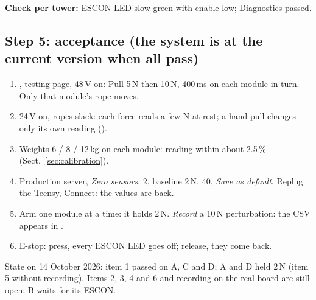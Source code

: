 \textbf{Check per tower:} ESCON LED slow green with enable low; Diagnostics passed.

\subsection{Step 5: acceptance (the system is at the current version when all pass)}
\begin{enumerate}
\item {}, testing page, 48\,V on: Pull 5\,N then
10\,N, 400\,ms on each module in turn. Only that module's rope moves.
\item 24\,V on, ropes slack: each force reads a few N at rest; a hand pull changes only its own reading
().
\item Weights 6 / 8 / 12\,kg on each module: reading within about 2.5\,\% (Sect.~\ref{sec:calibration}).
\item Production server, \emph{Zero sensors},  2, baseline 2\,N,  40, \emph{Save as
default}. Replug the Teensy, Connect: the values are back.
\item Arm one module at a time: it holds 2\,N. \emph{Record} a 10\,N perturbation: the CSV appears in
.
\item E-stop: press, every ESCON LED goes off; release, they come back.
\end{enumerate}
State on 14 October 2026: item 1 passed on A, C and D; A and D held 2\,N (item 5 without recording).
Items 2, 3, 4 and 6 and recording on the real board are still open; B waits for its ESCON.
